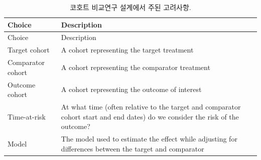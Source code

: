 \documentclass[11pt]{book}
\theoremstyle{definition}
\theoremstyle{definition}
\theoremstyle{definition}
\theoremstyle{remark}
\begin{document}
\begin{longtable}[]{@{}ll@{}}
\caption{\label{tab:cmChoices} 코호트 비교연구 설계에서 주된
고려사항.}\tabularnewline
\toprule
\begin{minipage}[b]{0.23\columnwidth}\raggedright\strut
Choice\strut
\end{minipage} & \begin{minipage}[b]{0.71\columnwidth}\raggedright\strut
Description\strut
\end{minipage}\tabularnewline
\midrule
\endfirsthead
\toprule
\begin{minipage}[b]{0.23\columnwidth}\raggedright\strut
Choice\strut
\end{minipage} & \begin{minipage}[b]{0.71\columnwidth}\raggedright\strut
Description\strut
\end{minipage}\tabularnewline
\midrule
\endhead
\begin{minipage}[t]{0.23\columnwidth}\raggedright\strut
Target cohort\strut
\end{minipage} & \begin{minipage}[t]{0.71\columnwidth}\raggedright\strut
A cohort representing the target treatment\strut
\end{minipage}\tabularnewline
\begin{minipage}[t]{0.23\columnwidth}\raggedright\strut
Comparator cohort\strut
\end{minipage} & \begin{minipage}[t]{0.71\columnwidth}\raggedright\strut
A cohort representing the comparator treatment\strut
\end{minipage}\tabularnewline
\begin{minipage}[t]{0.23\columnwidth}\raggedright\strut
Outcome cohort\strut
\end{minipage} & \begin{minipage}[t]{0.71\columnwidth}\raggedright\strut
A cohort representing the outcome of interest\strut
\end{minipage}\tabularnewline
\begin{minipage}[t]{0.23\columnwidth}\raggedright\strut
Time-at-risk\strut
\end{minipage} & \begin{minipage}[t]{0.71\columnwidth}\raggedright\strut
At what time (often relative to the target and comparator cohort start
and end dates) do we consider the risk of the outcome?\strut
\end{minipage}\tabularnewline
\begin{minipage}[t]{0.23\columnwidth}\raggedright\strut
Model\strut
\end{minipage} & \begin{minipage}[t]{0.71\columnwidth}\raggedright\strut
The model used to estimate the effect while adjusting for differences
between the target and comparator\strut
\end{minipage}\tabularnewline
\bottomrule
\end{longtable}
\end{document}
